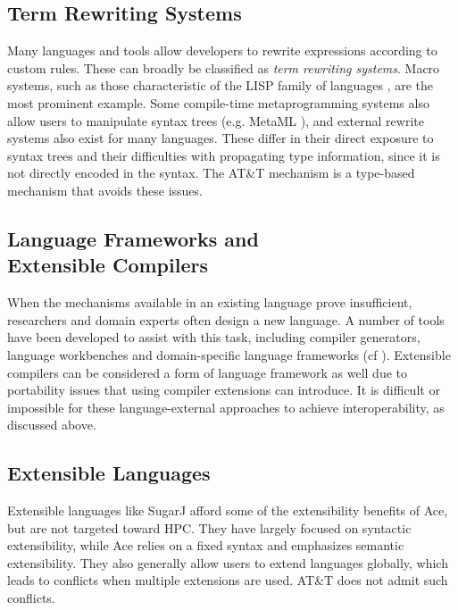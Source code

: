 \documentclass[9pt,preprint]{sigplanconf}
\begin{document}
\subsection{Term Rewriting Systems}
Many languages and tools allow developers to rewrite expressions according to custom rules. These can broadly be classified as {\it term rewriting systems}. Macro systems, such as those characteristic of the LISP family of languages \cite{mccarthy1978history}, are the most prominent example. Some compile-time metaprogramming systems also allow users to manipulate syntax trees (e.g. MetaML \cite{Sheard:1999:UMS}), and external rewrite systems also exist for many languages. These differ in their direct exposure to syntax trees and their difficulties with propagating type information, since it is not directly encoded in the syntax. The AT\&T mechanism is a type-based mechanism that avoids these issues.

\subsection{Language Frameworks and \\Extensible Compilers}
When the mechanisms available in an existing language prove insufficient, researchers and domain experts often design a new language. A number of tools have been developed to assist with this task, including compiler generators, language workbenches and domain-specific language frameworks (cf \cite{fowler2010domain}). Extensible compilers can be considered a form of language framework as well due to portability issues that using compiler extensions can introduce. It is difficult or impossible for these language-external approaches to achieve interoperability, as discussed above.

\subsection{Extensible Languages}
Extensible languages like SugarJ \cite{erdweg2011sugarj} afford some of the extensibility benefits of Ace, but are not targeted toward HPC. They have largely focused on syntactic extensibility, while Ace relies on a fixed syntax and emphasizes semantic extensibility. They also generally allow users to extend languages globally, which leads to conflicts when multiple extensions are used. AT\&T does not admit such conflicts.
\end{document}
